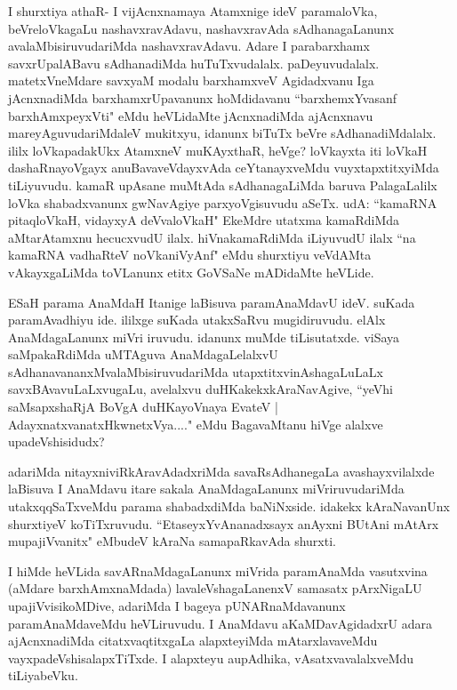 \begin{artha}
I shurxtiya athaR- I vijAcnxnamaya Atamxnige ideV paramaloVka, beVreloVkagaLu nashavxravAdavu, nashavxravAda sAdhanagaLanunx avalaMbisiruvudariMda nashavxravAdavu. Adare I parabarxhamx savxrUpalABavu sAdhanadiMda huTuTxvudalalx. paDeyuvudalalx. matetxVneMdare savxyaM modalu barxhamxveV Agidadxvanu Iga jAcnxnadiMda barxhamxrUpavanunx hoMdidavanu ``barxhemxYvasanf barxhAmxpeyxVti" eMdu heVLidaMte jAcnxnadiMda ajAcnxnavu mareyAguvudariMdaleV mukitxyu, idanunx biTuTx beVre sAdhanadiMdalalx. ililx loVkapadakUkx AtamxneV muKAyxthaR, heVge? loVkayxta iti loVkaH dashaRnayoVgayx anuBavaveVdayxvAda ceYtanayxveMdu vuyxtapxtitxyiMda tiLiyuvudu. kamaR upAsane muMtAda sAdhanagaLiMda baruva PalagaLalilx loVka shabadxvanunx gwNavAgiye parxyoVgisuvudu aSeTx. udA: ``kamaRNA pitaqloVkaH, vidayxyA deVvaloVkaH" EkeMdre utatxma kamaRdiMda aMtarAtamxnu hecucxvudU ilalx. hiVnakamaRdiMda iLiyuvudU ilalx ``na kamaRNA vadhaRteV noVkaniVyAnf" eMdu shurxtiyu veVdAMta vAkayxgaLiMda toVLanunx etitx GoVSaNe mADidaMte heVLide. 
\end{artha}%

\begin{artha}
ESaH parama AnaMdaH Itanige laBisuva paramAnaMdavU ideV. suKada paramAvadhiyu ide. ililxge suKada utakxSaRvu mugidiruvudu. elAlx AnaMdagaLanunx miVri iruvudu. idanunx muMde tiLisutatxde. viSaya saMpakaRdiMda uMTAguva AnaMdagaLelalxvU sAdhanavananxMvalaMbisiruvudariMda utapxtitxvinAshagaLuLaLx savxBAvavuLaLxvugaLu, avelalxvu duHKakekxkAraNavAgive, ``yeVhi saMsapxshaRjA BoVgA duHKayoVnaya EvateV | AdayxnatxvanatxHkwnetxVya...." eMdu BagavaMtanu hiVge alalxve upadeVshisidudx? 
\end{artha}

\begin{artha}
adariMda nitayxniviRkAravAdadxriMda savaRsAdhanegaLa avashayxvilalxde laBisuva I AnaMdavu itare sakala AnaMdagaLanunx miVriruvudariMda utakxqqSaTxveMdu parama shabadxdiMda baNiNxside. idakekx kAraNavanUnx shurxtiyeV koTiTxruvudu. ``EtaseyxYvAnanadxsayx anAyxni BUtAni mAtArx mupajiVvanitx" eMbudeV kAraNa samapaRkavAda shurxti.
\end{artha}


\begin{artha}
I hiMde heVLida savARnaMdagaLanunx miVrida paramAnaMda vasutxvina (aMdare barxhAmxnaMdada) lavaleVshagaLanenxV samasatx pArxNigaLU upajiVvisikoMDive, adariMda I bageya pUNARnaMdavanunx paramAnaMdaveMdu heVLiruvudu. I AnaMdavu aKaMDavAgidadxrU adara ajAcnxnadiMda citatxvaqtitxgaLa alapxteyiMda mAtarxlavaveMdu vayxpadeVshisalapxTiTxde. I alapxteyu aupAdhika, vAsatxvavalalxveMdu tiLiyabeVku.   
\end{artha}

